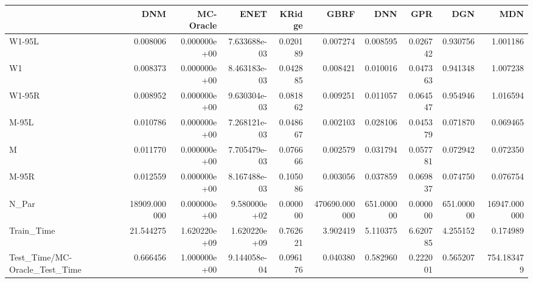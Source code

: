 \begin{tabular}{lrrrrrrrrr}
\toprule
{} &           DNM &     MC-Oracle &          ENET &    KRidge &           GBRF &         DNN &       GPR &         DGN &           MDN \\
\midrule
W1-95L                        &      0.008006 &  0.000000e+00 &  7.633688e-03 &  0.020189 &       0.007274 &    0.008595 &  0.026742 &    0.930756 &      1.001186 \\
W1                            &      0.008373 &  0.000000e+00 &  8.463183e-03 &  0.042885 &       0.008421 &    0.010016 &  0.047363 &    0.941348 &      1.007238 \\
W1-95R                        &      0.008952 &  0.000000e+00 &  9.630304e-03 &  0.081862 &       0.009251 &    0.011057 &  0.064547 &    0.954946 &      1.016594 \\
M-95L                         &      0.010786 &  0.000000e+00 &  7.268121e-03 &  0.048667 &       0.002103 &    0.028106 &  0.045379 &    0.071870 &      0.069465 \\
M                             &      0.011770 &  0.000000e+00 &  7.705479e-03 &  0.076666 &       0.002579 &    0.031794 &  0.057781 &    0.072942 &      0.072350 \\
M-95R                         &      0.012559 &  0.000000e+00 &  8.167488e-03 &  0.105086 &       0.003056 &    0.037859 &  0.069837 &    0.074750 &      0.076754 \\
N\_Par                         &  18909.000000 &  0.000000e+00 &  9.580000e+02 &  0.000000 &  470690.000000 &  651.000000 &  0.000000 &  651.000000 &  16947.000000 \\
Train\_Time                    &     21.544275 &  1.620220e+09 &  1.620220e+09 &  0.762621 &       3.902419 &    5.110375 &  6.620785 &    4.255152 &      0.174989 \\
Test\_Time/MC-Oracle\_Test\_Time &      0.666456 &  1.000000e+00 &  9.144058e-04 &  0.096176 &       0.040380 &    0.582960 &  0.222001 &    0.565207 &    754.183479 \\
\bottomrule
\end{tabular}

